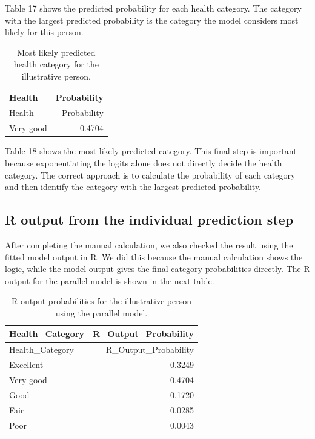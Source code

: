 \documentclass{article}
\begin{document}
Table 17 shows the predicted probability for each health category. The
category with the largest predicted probability is the category the
model considers most likely for this person.

\begin{longtable}[]{@{}lr@{}}
\caption{Most likely predicted health category for the illustrative
person.}\tabularnewline
\toprule\noalign{}
Health & Probability \\
\midrule\noalign{}
\endfirsthead
\toprule\noalign{}
Health & Probability \\
\midrule\noalign{}
\endhead
\bottomrule\noalign{}
\endlastfoot
Very good & 0.4704 \\
\end{longtable}

Table 18 shows the most likely predicted category. This final step is
important because exponentiating the logits alone does not directly
decide the health category. The correct approach is to calculate the
probability of each category and then identify the category with the
largest predicted probability.

\subsection{R output from the individual prediction
step}\label{r-output-from-the-individual-prediction-step}

After completing the manual calculation, we also checked the result
using the fitted model output in R. We did this because the manual
calculation shows the logic, while the model output gives the final
category probabilities directly. The R output for the parallel model is
shown in the next table.

\begin{longtable}[]{@{}lr@{}}
\caption{R output probabilities for the illustrative person using the
parallel model.}\tabularnewline
\toprule\noalign{}
Health\_Category & R\_Output\_Probability \\
\midrule\noalign{}
\endfirsthead
\toprule\noalign{}
Health\_Category & R\_Output\_Probability \\
\midrule\noalign{}
\endhead
\bottomrule\noalign{}
\endlastfoot
Excellent & 0.3249 \\
Very good & 0.4704 \\
Good & 0.1720 \\
Fair & 0.0285 \\
Poor & 0.0043 \\
\end{longtable}
\end{document}
